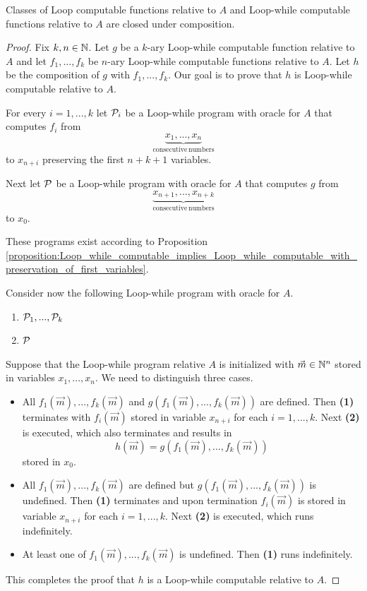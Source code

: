 \documentclass[10pt]{amsart}
\begin{document}
\begin{proposition}\label{proposition:Loop_while_computable_functions_closed_under_composition}
	Classes of Loop computable functions relative to $A$ and Loop-while computable functions relative to $A$ are closed under composition.
\end{proposition}
\begin{proof}
	Fix $k,n \in {\mathbb N}$. Let $g$ be a $k$-ary Loop-while computable function relative to $A$ and let $f_1,...,f_k$ be $n$-ary Loop-while computable functions relative to $A$. Let $h$ be the composition of $g$ with $f_1,...,f_k$. Our goal is to prove that $h$ is Loop-while computable relative to $A$.

	For every $i = 1,...,k$ let ${\mathcal P}_i$ be a Loop-while program with oracle for $A$ that computes $f_i$ from
	$$\underbrace{x_1,...,x_n}_{\mathrm{consecutive\,numbers}}$$
	to $x_{n + i}$ preserving the first $n + k + 1$ variables.

	Next let ${\mathcal P}$ be a Loop-while program with oracle for $A$ that computes $g$ from
	$$\underbrace{x_{n + 1},...,x_{n + k}}_{\mathrm{consecutive\,numbers}}$$
	to $x_0$.

	These programs exist according to Proposition \ref{proposition:Loop_while_computable_implies_Loop_while_computable_with_preservation_of_first_variables}.

	Consider now the following Loop-while program with oracle for $A$.
	\begin{enumerate}[label=\textbf{(\arabic*)}, leftmargin=3.0em]
		\item ${\mathcal P}_1,...,{\mathcal P}_k$
		\item ${\mathcal P}$
	\end{enumerate}
	Suppose that the Loop-while program relative $A$ is initialized with $\vec{m} \in {\mathbb N}^{n}$ stored in variables $x_1,...,x_n$. We need to distinguish three cases.
	\begin{itemize}
		\item All $f_1(\vec{m}),...,f_k(\vec{m})$ and $g\left(f_1(\vec{m}),...,f_k(\vec{m})\right)$ are defined. Then \textbf{(1)} terminates with $f_i(\vec{m})$ stored in variable $x_{n + i}$ for each $i = 1,...,k$. Next \textbf{(2)} is executed, which also terminates and results in
		      $$h(\vec{m}) = g\left(f_1(\vec{m}),...,f_k(\vec{m})\right)$$
		      stored in $x_0$.
		\item  All $f_1(\vec{m}),...,f_k(\vec{m})$ are defined but $g\left(f_1(\vec{m}),...,f_k(\vec{m})\right)$ is undefined. Then \textbf{(1)} terminates and upon termination $f_i(\vec{m})$ is stored in variable $x_{n + i}$ for each $i = 1,...,k$. Next \textbf{(2)} is executed, which runs indefinitely.
		\item At least one of $f_1(\vec{m}),...,f_k(\vec{m})$ is undefined. Then \textbf{(1)} runs indefinitely.
	\end{itemize}
	This completes the proof that $h$ is a Loop-while computable relative to $A$.


\end{proof}
\end{document}
